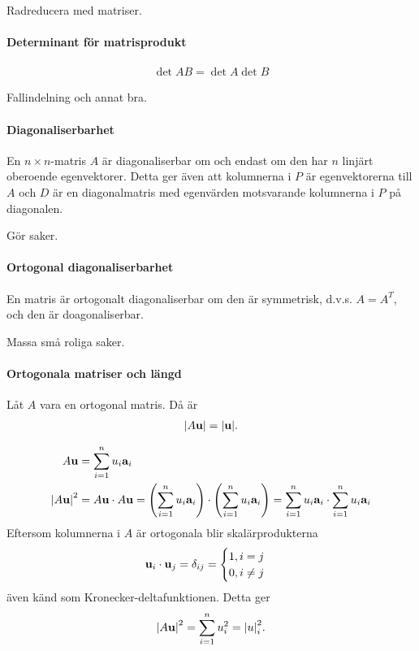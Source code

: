 \proof
Radreducera med matriser.

\paragraph{Determinant för matrisprodukt}
\begin{align*}
	\det{AB} = \det{A}\det{B}
\end{align*}

\proof
Fallindelning och annat bra.

\paragraph{Diagonaliserbarhet}
En $n\times n$-matris $A$ är diagonaliserbar om och endast om den har $n$ linjärt oberoende egenvektorer. Detta ger även att kolumnerna i $P$ är egenvektorerna till $A$ och $D$ är en diagonalmatris med egenvärden motsvarande kolumnerna i $P$ på diagonalen.

\proof
Gör saker.

\paragraph{Ortogonal diagonaliserbarhet}
En matris är ortogonalt diagonaliserbar om den är symmetrisk, d.v.s. $A = A^T$, och den är doagonaliserbar.

\proof
Massa små roliga saker.

\paragraph{Ortogonala matriser och längd}
Låt $A$ vara en ortogonal matris. Då är
\begin{align*}
	\abs{A\vect{u}} = \abs{\vect{u}}.
\end{align*}

\proof
\begin{align*}
	A\vect{u}         &= \sum\limits_{i = 1}^{n}u_i\vect{a}_i \\
	\abs{A\vect{u}}^2 &= A\vect{u}\cdot A\vect{u} = \left(\sum\limits_{i = 1}^{n}u_i\vect{a}_i\right)\cdot\left(\sum\limits_{i = 1}^{n}u_i\vect{a}_i\right) = \sum\limits_{i = 1}^{n}u_i\vect{a}_i\cdot\sum\limits_{i = 1}^{n}u_i\vect{a}_i
\end{align*}
Eftersom kolumnerna i $A$ är ortogonala blir skalärprodukterna
\begin{align*}
	\vect{u}_i\cdot\vect{u}_j = \delta_{ij} =
	\begin{cases}
		1, i = j \\
		0, i\neq j
	\end{cases}
\end{align*}
även känd som Kronecker-deltafunktionen. Detta ger
\begin{align*}
	\abs{A\vect{u}}^2 = \sum\limits_{i = 1}^{n}u_i^2 = \abs{u}_i^2.
\end{align*}


